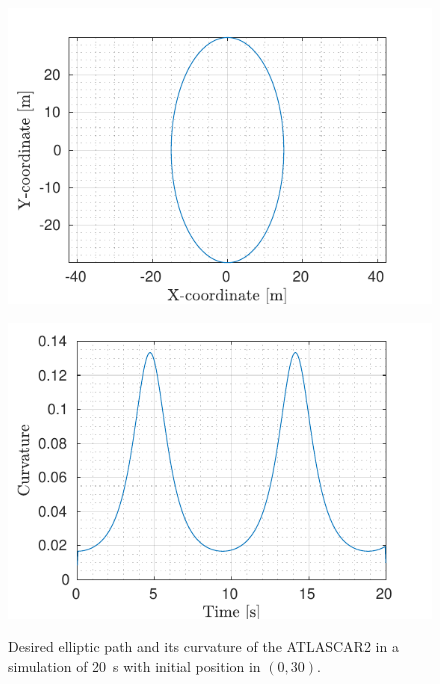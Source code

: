 \begin{figure}[!h]
	\begin{minipage}[t]{0.5\textwidth}
		\includegraphics[width=\textwidth]{../../MATLAB/lane_following_circular_path/figure/Reference_circular.pdf}
		\subcaption{}
		\label{fig:reference_laneFollowing_circular}
	\end{minipage}
	\begin{minipage}[t]{0.5\textwidth}
		\includegraphics[width=\textwidth]{../../MATLAB/lane_following_circular_path/figure/Curvature_circular.pdf}
		\subcaption{}
		\label{fig:curvature_laneFollowing_circular}
	\end{minipage}
	\caption{Desired elliptic path and its curvature of the ATLASCAR2 in a simulation of \SI{20}{s} with initial position in $(0,30)$.}
	\label{fig:laneFollowing_desired_circular}
\end{figure}

